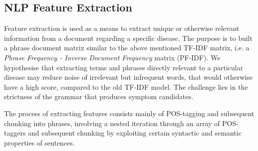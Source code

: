 \documentclass[10pt,letterpaper,final]{article}
\begin{document}



\subsection{NLP Feature Extraction}
\label{chap:nlpmodel}
Feature extraction is used as a means to extract unique or otherwise
relevant information from a document regarding a specific disease. The
purpose is to built a phrase document matrix similar to the above
mentioned TF-IDF matrix, i.e. a \textit{Phrase Frequency - Inverse
Document Frequency} matrix (PF-IDF). We hypothesise that extracting
terms and phrases directly relevant to a particular disease may reduce
noise of irrelevant but infrequent words, that would otherwise have a
high score, compared to the old TF-IDF model. The challenge lies in the
strictness of the grammar that produces symptom candidates.

The process of extracting features consists mainly of POS-tagging and
subsequent chunking into phrases, involving a nested iteration through
an array of POS-taggers and subsequent chunking by exploiting certain
syntactic and semantic properties of sentences.
\end{document}
